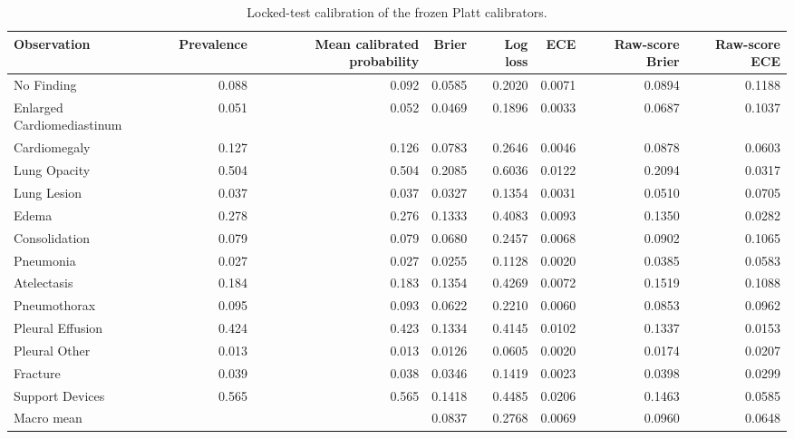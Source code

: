 \begin{table}[t]
\centering
\scriptsize
\begin{tabular}{lrrrrrrr}
\hline
Observation & Prevalence & Mean calibrated probability & Brier & Log loss & ECE & Raw-score Brier & Raw-score ECE \\
\hline
No Finding & 0.088 & 0.092 & 0.0585 & 0.2020 & 0.0071 & 0.0894 & 0.1188 \\
Enlarged Cardiomediastinum & 0.051 & 0.052 & 0.0469 & 0.1896 & 0.0033 & 0.0687 & 0.1037 \\
Cardiomegaly & 0.127 & 0.126 & 0.0783 & 0.2646 & 0.0046 & 0.0878 & 0.0603 \\
Lung Opacity & 0.504 & 0.504 & 0.2085 & 0.6036 & 0.0122 & 0.2094 & 0.0317 \\
Lung Lesion & 0.037 & 0.037 & 0.0327 & 0.1354 & 0.0031 & 0.0510 & 0.0705 \\
Edema & 0.278 & 0.276 & 0.1333 & 0.4083 & 0.0093 & 0.1350 & 0.0282 \\
Consolidation & 0.079 & 0.079 & 0.0680 & 0.2457 & 0.0068 & 0.0902 & 0.1065 \\
Pneumonia & 0.027 & 0.027 & 0.0255 & 0.1128 & 0.0020 & 0.0385 & 0.0583 \\
Atelectasis & 0.184 & 0.183 & 0.1354 & 0.4269 & 0.0072 & 0.1519 & 0.1088 \\
Pneumothorax & 0.095 & 0.093 & 0.0622 & 0.2210 & 0.0060 & 0.0853 & 0.0962 \\
Pleural Effusion & 0.424 & 0.423 & 0.1334 & 0.4145 & 0.0102 & 0.1337 & 0.0153 \\
Pleural Other & 0.013 & 0.013 & 0.0126 & 0.0605 & 0.0020 & 0.0174 & 0.0207 \\
Fracture & 0.039 & 0.038 & 0.0346 & 0.1419 & 0.0023 & 0.0398 & 0.0299 \\
Support Devices & 0.565 & 0.565 & 0.1418 & 0.4485 & 0.0206 & 0.1463 & 0.0585 \\
Macro mean &  &  & 0.0837 & 0.2768 & 0.0069 & 0.0960 & 0.0648 \\
\hline
\end{tabular}
\caption{Locked-test calibration of the frozen Platt calibrators.}
\label{tab:table5_locked_test_calibration}
\end{table}
